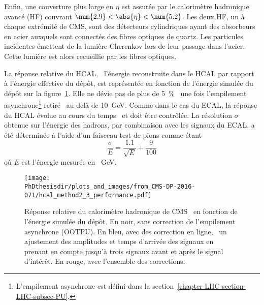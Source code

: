 \par Enfin, une couverture plus large en $\eta$ est assurée par le calorimètre hadronique avancé (HF) couvrant $\num{2.9}<\abs{\eta}<\num{5.2}$.
Les deux HF, un à chaque extrémité de CMS, sont des détecteurs cylindriques ayant des absorbeurs en acier auxquels sont connectés des fibres optiques de quartz.
Les particules incidentes émettent de la lumière Cherenkov lors de leur passage dans l'acier.
Cette lumière est alors recueillie par les fibres optiques.
\par La réponse relative du HCAL, \ie\ l'énergie reconstruite dans le HCAL par rapport à l'énergie effective du dépôt, est représentée en fonction de l'énergie simulée du dépôt sur la figure~\ref{fig-chapter-LHC-section-CMS-subsec-HCAL-CMS-DP-2016-071-hcal_method2_3_performance}.
Elle ne dévie pas de plus de \SI{5}{\%}~\cite{CMS-DP-2016-071} une fois l'empilement asynchrone\footnote{L'empilement asynchrone est défini dans la section~\ref{chapter-LHC-section-LHC-subsec-PU}.} retiré~\cite{CMS-DP-2016-071,CMS-DP-2018-018} au-delà de \SI{10}{\GeV}.
Comme dans le cas du ECAL, la réponse du HCAL évolue au cours du temps~\cite{CMS-DP-2017-033} et doit être contrôlée.
La résolution $\sigma$ obtenue sur l'énergie des hadrons, par combinaison avec les signaux du ECAL, a été déterminée à l'aide d'un faisceau test de pions comme étant
\begin{equation}
\frac{\sigma}{E} = \frac{\num{1.1}}{\sqrt{E}} + \frac{9}{100}
\end{equation}
où $E$ est l'énergie mesurée en \SI{}{\GeV}.
\begin{figure}[h]
\centering
\texttt{[image: \\PhDthesisdir/plots\_and\_images/from\_CMS-DP-2016-071/hcal\_method2\_3\_performance.pdf]}
\caption[Réponse relative du calorimètre hadronique de CMS.]{Réponse relative du calorimètre hadronique de CMS~\cite{CMS-DP-2016-071} en fonction de l'énergie simulée du dépôt. En noir, sans correction de l'empilement asynchrone (OOTPU). En bleu, avec des correction en ligne, \ie\ un ajustement des amplitudes et temps d'arrivée des signaux en prenant en compte jusqu'à trois signaux avant et après le signal d'intérêt. En rouge, avec l'ensemble des corrections.}
\label{fig-chapter-LHC-section-CMS-subsec-HCAL-CMS-DP-2016-071-hcal_method2_3_performance}
\end{figure}